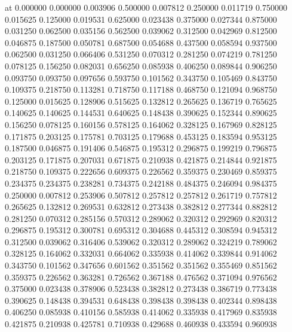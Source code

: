  at
0.000000   0.000000   
0.003906   0.500000   
0.007812   0.250000   
0.011719   0.750000   
0.015625   0.125000   
0.019531   0.625000   
0.023438   0.375000   
0.027344   0.875000   
0.031250   0.062500   
0.035156   0.562500   
0.039062   0.312500   
0.042969   0.812500   
0.046875   0.187500   
0.050781   0.687500   
0.054688   0.437500   
0.058594   0.937500   
0.062500   0.031250   
0.066406   0.531250   
0.070312   0.281250   
0.074219   0.781250   
0.078125   0.156250   
0.082031   0.656250   
0.085938   0.406250   
0.089844   0.906250   
0.093750   0.093750   
0.097656   0.593750   
0.101562   0.343750   
0.105469   0.843750   
0.109375   0.218750   
0.113281   0.718750   
0.117188   0.468750   
0.121094   0.968750   
0.125000   0.015625   
0.128906   0.515625   
0.132812   0.265625   
0.136719   0.765625   
0.140625   0.140625   
0.144531   0.640625   
0.148438   0.390625   
0.152344   0.890625   
0.156250   0.078125   
0.160156   0.578125   
0.164062   0.328125   
0.167969   0.828125   
0.171875   0.203125   
0.175781   0.703125   
0.179688   0.453125   
0.183594   0.953125   
0.187500   0.046875   
0.191406   0.546875   
0.195312   0.296875   
0.199219   0.796875   
0.203125   0.171875   
0.207031   0.671875   
0.210938   0.421875   
0.214844   0.921875   
0.218750   0.109375   
0.222656   0.609375   
0.226562   0.359375   
0.230469   0.859375   
0.234375   0.234375   
0.238281   0.734375   
0.242188   0.484375   
0.246094   0.984375   
0.250000   0.007812   
0.253906   0.507812   
0.257812   0.257812   
0.261719   0.757812   
0.265625   0.132812   
0.269531   0.632812   
0.273438   0.382812   
0.277344   0.882812   
0.281250   0.070312   
0.285156   0.570312   
0.289062   0.320312   
0.292969   0.820312   
0.296875   0.195312   
0.300781   0.695312   
0.304688   0.445312   
0.308594   0.945312   
0.312500   0.039062   
0.316406   0.539062   
0.320312   0.289062   
0.324219   0.789062   
0.328125   0.164062   
0.332031   0.664062   
0.335938   0.414062   
0.339844   0.914062   
0.343750   0.101562   
0.347656   0.601562   
0.351562   0.351562   
0.355469   0.851562   
0.359375   0.226562   
0.363281   0.726562   
0.367188   0.476562   
0.371094   0.976562   
0.375000   0.023438   
0.378906   0.523438   
0.382812   0.273438   
0.386719   0.773438   
0.390625   0.148438   
0.394531   0.648438   
0.398438   0.398438   
0.402344   0.898438   
0.406250   0.085938   
0.410156   0.585938   
0.414062   0.335938   
0.417969   0.835938   
0.421875   0.210938   
0.425781   0.710938   
0.429688   0.460938   
0.433594   0.960938   

